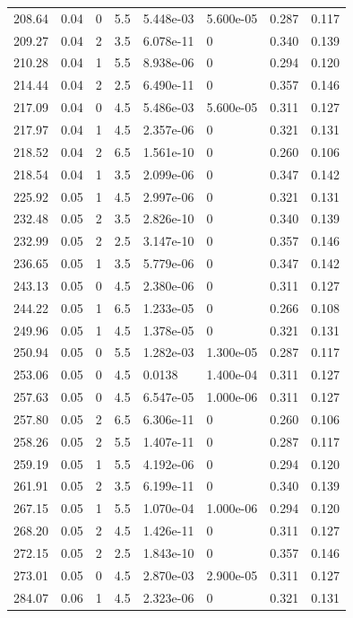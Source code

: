 \documentclass[preview]{standalone}
\begin{document}
{{{\begin{tabular}{L{1.2cm}C{1.2cm} C{0.3cm}C{0.5cm} C{1.4cm}C{1.4cm} C{1.4cm}C{1.4cm}}
  208.64  &  0.04  & 0     & 5.5 &  5.448e-03  & 5.600e-05  & 0.287 &  0.117   \\ 
  209.27  &  0.04  & 2     & 3.5 &  6.078e-11  & 0  & 0.340 &  0.139   \\ 
  210.28  &  0.04  & 1     & 5.5 &  8.938e-06  & 0  & 0.294 &  0.120   \\ 
  214.44  &  0.04  & 2     & 2.5 &  6.490e-11  & 0  & 0.357 &  0.146   \\ 
  217.09  &  0.04  & 0     & 4.5 &  5.486e-03  & 5.600e-05  & 0.311 &  0.127   \\ 
  217.97  &  0.04  & 1     & 4.5 &  2.357e-06  & 0  & 0.321 &  0.131   \\ 
  218.52  &  0.04  & 2     & 6.5 &  1.561e-10  & 0  & 0.260 &  0.106   \\ 
  218.54  &  0.04  & 1     & 3.5 &  2.099e-06  & 0  & 0.347 &  0.142   \\ 
  225.92  &  0.05  & 1     & 4.5 &  2.997e-06  & 0  & 0.321 &  0.131   \\ 
  232.48  &  0.05  & 2     & 3.5 &  2.826e-10  & 0  & 0.340 &  0.139   \\ 
  232.99  &  0.05  & 2     & 2.5 &  3.147e-10  & 0  & 0.357 &  0.146   \\ 
  236.65  &  0.05  & 1     & 3.5 &  5.779e-06  & 0  & 0.347 &  0.142   \\ 
  243.13  &  0.05  & 0     & 4.5 &  2.380e-06  & 0  & 0.311 &  0.127   \\ 
  244.22  &  0.05  & 1     & 6.5 &  1.233e-05  & 0  & 0.266 &  0.108   \\ 
  249.96  &  0.05  & 1     & 4.5 &  1.378e-05  & 0  & 0.321 &  0.131   \\ 
  250.94  &  0.05  & 0     & 5.5 &  1.282e-03  & 1.300e-05  & 0.287 &  0.117   \\ 
  253.06  &  0.05  & 0     & 4.5 &  0.0138  & 1.400e-04  & 0.311 &  0.127   \\ 
  257.63  &  0.05  & 0     & 4.5 &  6.547e-05  & 1.000e-06  & 0.311 &  0.127   \\ 
  257.80  &  0.05  & 2     & 6.5 &  6.306e-11  & 0  & 0.260 &  0.106   \\ 
  258.26  &  0.05  & 2     & 5.5 &  1.407e-11  & 0  & 0.287 &  0.117   \\ 
  259.19  &  0.05  & 1     & 5.5 &  4.192e-06  & 0  & 0.294 &  0.120   \\ 
  261.91  &  0.05  & 2     & 3.5 &  6.199e-11  & 0  & 0.340 &  0.139   \\ 
  267.15  &  0.05  & 1     & 5.5 &  1.070e-04  & 1.000e-06  & 0.294 &  0.120   \\ 
  268.20  &  0.05  & 2     & 4.5 &  1.426e-11  & 0  & 0.311 &  0.127   \\ 
  272.15  &  0.05  & 2     & 2.5 &  1.843e-10  & 0  & 0.357 &  0.146   \\ 
  273.01  &  0.05  & 0     & 4.5 &  2.870e-03  & 2.900e-05  & 0.311 &  0.127   \\ 
  284.07  &  0.06  & 1     & 4.5 &  2.323e-06  & 0  & 0.321 &  0.131   \\ 
\hline 
\end{tabular} 

}}}
\end{document}
